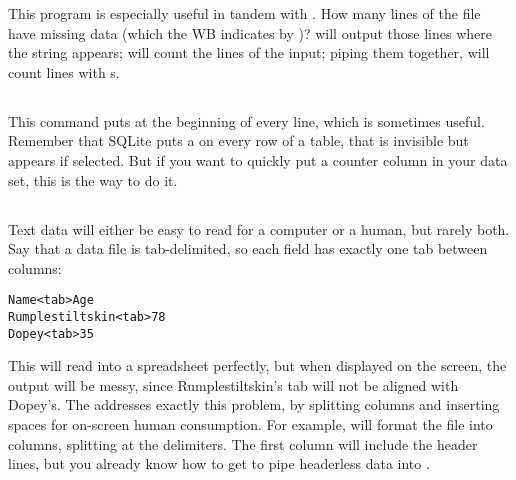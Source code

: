This program is especially useful in tandem with . How many lines
of the  file have missing data (which the WB indicates by
)?  will output those lines
where the string  appears;  will count the lines of the
input; piping them together,  will count lines with s.

\subsection{} This command puts  at the
beginning of every line, which is sometimes useful. Remember that SQLite
puts a  on every row of a table, that is invisible but
appears if \si{select}ed. But if you want to quickly put a counter
column in your data set, this is the way to do it.


\subsection{} Text data 
will either be easy to read for a computer or a human, but rarely both.
Say that a data file is tab-delimited, so each field has exactly one tab
between columns:
\begin{lstlisting}
Name<tab>Age
Rumplestiltskin<tab>78
Dopey<tab>35
\end{lstlisting}

This will read into a spreadsheet perfectly, but when displayed on the
screen, the output will be messy, since Rumplestiltskin's tab will not
be aligned with Dopey's. The  addresses exactly this problem,
by splitting columns and inserting spaces for on-screen human
consumption. For example,  will format
the  file into columns, splitting at the \bi{|}
delimiters. The first column will include the header lines, but you
already know how to get  to pipe headerless data into
.





